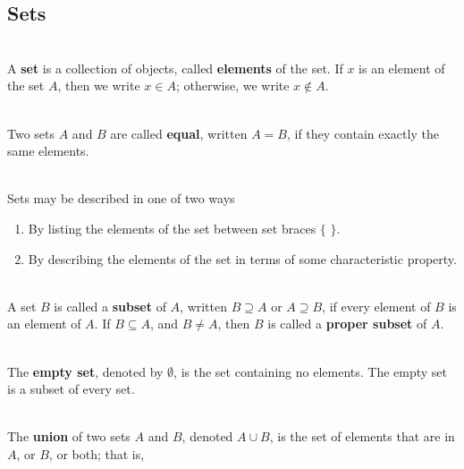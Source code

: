 \begin{alphasection}
	\section{Sets}

	\begin{definition}
		\hfill\\
		A \textbf{set} is a collection of objects, called \textbf{elements} of the set. If $x$ is an element of the set $A$, then we write $x \in A$; otherwise, we write $x \notin A$.
	\end{definition}

	\begin{definition}
		\hfill\\
		Two sets $A$ and $B$ are called \textbf{equal}, written $A = B$, if they contain exactly the same elements.
	\end{definition}

	\begin{remark}
		\hfill\\
		Sets may be described in one of two ways

		\begin{enumerate}
			\item By listing the elements of the set between set braces $\{$ $\}$.
			\item By describing the elements of the set in terms of some characteristic property.
		\end{enumerate}
	\end{remark}

	\begin{definition}
		\hfill\\
		A set $B$ is called a \textbf{subset} of $A$, written $B \supseteq A$ or $A \supseteq B$, if every element of $B$ is an element of $A$. If $B \subseteq A$, and $B \neq A$, then $B$ is called a \textbf{proper subset} of $A$.
	\end{definition}

	\begin{definition}
		\hfill\\
		The \textbf{empty set}, denoted by $\emptyset$, is the set containing no elements. The empty set is a subset of every set.
	\end{definition}

	\begin{definition}
		\hfill\\
		The \textbf{union} of two sets $A$ and $B$, denoted $A \cup B$, is the set of elements that are in $A$, or $B$, or both; that is,


\end{definition}
\end{alphasection}
